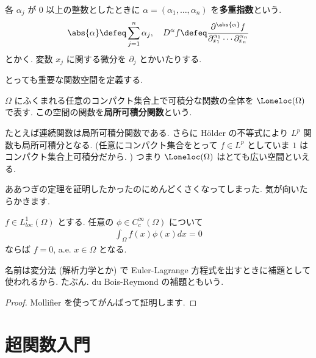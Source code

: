 \documentclass[openany, a4paper, oneside]{jsbook}
\begin{document}
\begin{defn}[多重指数]
 各 $\alpha_j$ が $0$ 以上の整数としたときに $\alpha = (\alpha_1 , \dots , \alpha_n)$ を\textbf{多重指数}という.
 \begin{align}
  \abs{\alpha}
  \defeq
  \sum_{j=1}^{n}\alpha_j, \quad
  D^{\alpha}f
  \defeq
  \frac{\partial^{\abs{\alpha}}f}{\partial_{x_1}^{\alpha_1} \cdots \partial_{x_n}^{\alpha_n}}
 \end{align}
 とかく.
 変数 $x_j$ に関する微分を $\partial_j$ とかいたりする.
\end{defn}

とっても重要な関数空間を定義する.
\begin{defn}[局所可積分関数]
 $\Omega$ にふくまれる任意のコンパクト集合上で可積分な関数の全体を $\Loneloc (\Omega)$ で表す.
 この空間の関数を\textbf{局所可積分関数}という.
\end{defn}

たとえば連続関数は局所可積分関数である.
さらに H\"older の不等式により $L^p$ 関数も局所可積分となる.
(任意にコンパクト集合をとって $f\in L^p$ としていま $1$ はコンパクト集合上可積分だから. )
つまり $\Loneloc (\Omega)$ はとても広い空間といえる.

ああつぎの定理を証明したかったのにめんどくさくなってしまった.
気が向いたらかきます.

\begin{defn}[変分法の基本補題]
 $f\in L_{loc}^1 (\Omega)$ とする.
 任意の $\phi \in C_c^{\infty}(\Omega)$ について
 \begin{align}
  \int_{\Omega}f (x)\phi (x) dx = 0
 \end{align}
 ならば $f = 0$, a.e. $x \in \Omega$ となる.
\end{defn}
\begin{rem}
名前は変分法 (解析力学とか) で Euler-Lagrange 方程式を出すときに補題として使われるから.
たぶん.
du Bois-Reymond の補題ともいう.
\end{rem}
\begin{proof}
Mollifier を使ってがんばって証明します.
\end{proof}
\section{超関数入門}
\end{document}
